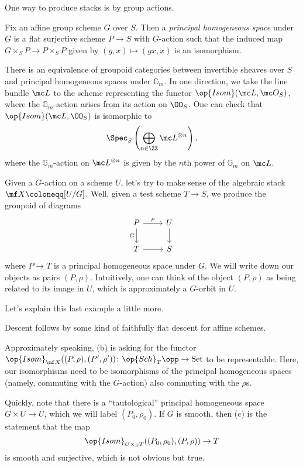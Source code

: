 \documentclass{article}
\begin{document}
One way to produce stacks is by group actions.
\begin{definition}
    Fix an affine group scheme $G$ over $S$. Then a \textit{principal homogeneous space} under $G$ is a flat surjective scheme $P\to S$ with $G$-action such that the induced map $G\times_SP\to P\times_SP$ given by $(g,x)\mapsto(gx,x)$ is an isomorphism.
\end{definition}
\begin{example}
    There is an equivalence of groupoid categories between invertible sheaves over $S$ and principal homogeneous spaces under $\mathbb G_m$. In one direction, we take the line bundle $\mc L$ to the scheme representing the functor $\op{Isom}(\mc L,\mc O_S)$, where the $\mathbb G_m$-action arises from its action on $\OO_S$. One can check that $\op{Isom}(\mc L,\OO_S)$ is isomorphic to
    \[\Spec_S\left(\bigoplus_{n\in\ZZ}\mc L^{\otimes n}\right),\]
    where the $\mathbb G_m$-action on $\mc L^{\otimes n}$ is given by the $n$th power of $\mathbb G_m$ on $\mc L$.
\end{example}
\begin{example}
    Given a $G$-action on a scheme $U$, let's try to make sense of the algebraic stack $\mf X\coloneqq[U/G]$. Well, given a test scheme $T\to S$, we produce the groupoid of diagrams
    \[\begin{tikzcd}
        P & U \\
        T & S
        \arrow["\rho", from=1-1, to=1-2]
        \arrow["G"', from=1-1, to=2-1]
        \arrow[from=1-2, to=2-2]
        \arrow[from=2-1, to=2-2]
    \end{tikzcd}\]
    where $P\to T$ is a principal homogeneous space under $G$. We will write down our objects as pairs $(P,\rho)$. Intuitively, one can think of the object $(P,\rho)$ as being related to its image in $U$, which is approximately a $G$-orbit in $U$.
\end{example}
Let's explain this last example a little more.
\begin{listalph}
    \item Descent follows by some kind of faithfully flat descent for affine schemes.
    \item Approximately speaking, (b) is asking for the functor $\op{Isom}_{\mf X}((P,\rho),(P',\rho'))\colon\op{Sch}_T\opp\to\mathrm{Set}$ to be representable. Here, our isomorphisms need to be isomorphisms of the principal homogeneous spaces (namely, commuting with the $G$-action) also commuting with the $\rho$s.
    \item Quickly, note that there is a ``tautological'' principal homogeneous space $G\times U\to U$, which we will label $(P_0,\rho_0)$. If $G$ is smooth, then (c) is the statement that the map
    \[\op{Isom}_{U\times_ST}((P_0,\rho_0),(P,\rho))\to T\]
    is smooth and surjective, which is not obvious but true.
\end{listalph}
\end{document}
